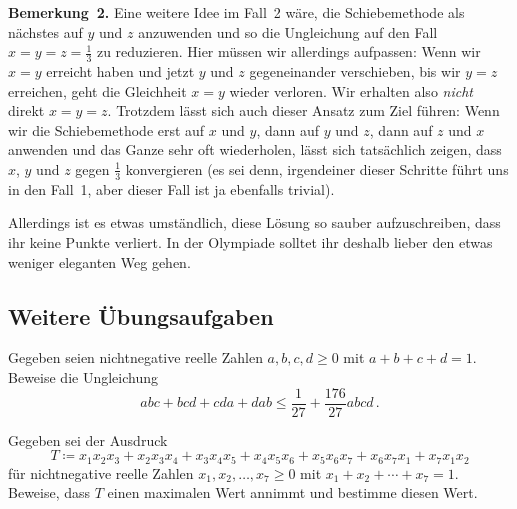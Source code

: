 \textbf{Bemerkung~2.} Eine weitere Idee im Fall~2 wäre, die Schiebemethode als nächstes auf $y$ und $z$ anzuwenden und so die Ungleichung auf den Fall $x=y=z=\frac13$ zu reduzieren. Hier müssen wir allerdings aufpassen: Wenn wir $x=y$ erreicht haben und jetzt $y$ und $z$ gegeneinander verschieben, bis wir $y=z$ erreichen, geht die Gleichheit $x=y$ wieder verloren. Wir erhalten also \emph{nicht} direkt $x=y=z$. Trotzdem lässt sich auch dieser Ansatz zum Ziel führen: Wenn wir die Schiebemethode erst auf $x$ und $y$, dann auf $y$ und $z$, dann auf $z$ und $x$ anwenden und das Ganze sehr oft wiederholen, lässt sich tatsächlich zeigen, dass $x$, $y$ und $z$ gegen $\frac13$ konvergieren (es sei denn, irgendeiner dieser Schritte führt uns in den Fall~1, aber dieser Fall ist ja ebenfalls trivial).

Allerdings ist es etwas umständlich, diese Lösung so sauber aufzuschreiben, dass ihr keine Punkte verliert. In der Olympiade solltet ihr deshalb lieber den etwas weniger eleganten Weg gehen.



\subsection*{Weitere Übungsaufgaben}

\begin{aufgabe*}
	Gegeben seien nichtnegative reelle Zahlen $a,b,c, d\geqslant 0$ mit $a+b+c+d=1$. Beweise die Ungleichung
	\begin{equation*}
		abc+bcd+cda+dab\leqslant \frac{1}{27}+\frac{176}{27}abcd\,.
	\end{equation*}
\end{aufgabe*}

\begin{aufgabe*}\label{exc:Ungleichung1}
	Gegeben sei der Ausdruck
	\begin{equation*}
		T\coloneqq x_1x_2x_3+x_2x_3x_4+x_3x_4x_5+x_4x_5x_6+x_5x_6x_7+x_6x_7x_1+x_7x_1x_2
	\end{equation*}
	für nichtnegative reelle Zahlen $x_1,x_2,\dotsc,x_7\geqslant 0$ mit $x_1+x_2+\dotsb+x_7=1$. Beweise, dass $T$ einen maximalen Wert annimmt und bestimme diesen Wert.
\end{aufgabe*}